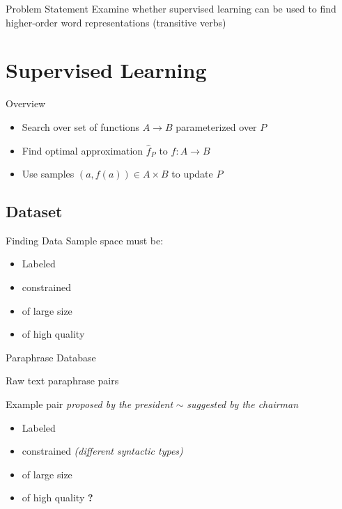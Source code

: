 \documentclass{beamer}
\newcommand{\xmark}{\ding{55}}
\begin{document}
\begin{frame}{Problem Statement}
\centering
Examine whether supervised learning can be used to find higher-order word representations (transitive verbs)
\end{frame}
	
\section{Supervised Learning}

\begin{frame}{Overview}
	\begin{itemize}
	\item Search over set of functions $A \to B$ parameterized over $P$
	\item Find optimal approximation $\hat{f}_P$ to $f: A \to B$
	\item Use samples $(a, f(a)) \in A\times B$ to update $P$
	\end{itemize}	
\end{frame}

\subsection{Dataset} 

\begin{frame}{Finding Data}
	Sample space must be:
	\begin{itemize}
	\item Labeled
	\item constrained
	\item of large size
	\item of high quality
	\end{itemize}
\end{frame}

\begin{frame}{Paraphrase Database}

	Raw text paraphrase pairs
	
	
	\begin{block}{Example pair}
	\small \textit{proposed by the president} $\sim$ \textit{suggested by the chairman}
	\end{block}
	
	\begin{itemize}
	\item Labeled \textcolor{Yes}{\checkmark}
	\item constrained \textcolor{No}{\xmark}
	\footnotesize\textit{(different syntactic types)}
	\normalsize
	\item of large size \textcolor{Yes}{\checkmark}
	\item of high quality \textcolor{Maybe}{\textbf{?}}
	\end{itemize}
\end{frame}
\end{document}
